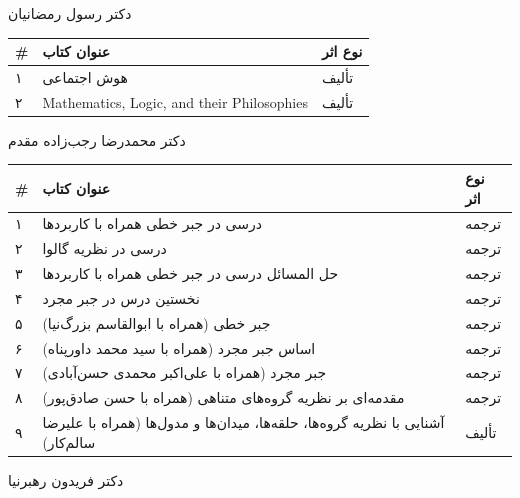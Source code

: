 \documentclass[
  letterpaper,
  DIV=11,
  numbers=noendperiod]{scrreprt}
\newcounter{none} %
\begin{document}
دکتر رسول رمضانیان

{\def\LTcaptype{none} %
\begin{longtable}[]{@{}lll@{}}
\toprule\noalign{}
\# & عنوان کتاب & نوع اثر \\
\midrule\noalign{}
\endhead
\bottomrule\noalign{}
\endlastfoot
۱ & هوش اجتماعی & تألیف \\
۲ & Mathematics, Logic, and their Philosophies & تألیف \\
\end{longtable}
}

دکتر محمدرضا رجب‌زاده مقدم

{\def\LTcaptype{none} %
\begin{longtable}[]{@{}
  >{\raggedright\arraybackslash}p{}
  >{\raggedright\arraybackslash}p{}
  >{\raggedright\arraybackslash}p{}@{}}
\toprule\noalign{}
\begin{minipage}[b]{\linewidth}\raggedright
\#
\end{minipage} & \begin{minipage}[b]{\linewidth}\raggedright
عنوان کتاب
\end{minipage} & \begin{minipage}[b]{\linewidth}\raggedright
نوع اثر
\end{minipage} \\
\midrule\noalign{}
\endhead
\bottomrule\noalign{}
\endlastfoot
۱ & درسی در جبر خطی همراه با کاربردها & ترجمه \\
۲ & درسی در نظریه گالوا & ترجمه \\
۳ & حل المسائل درسی در جبر خطی همراه با کاربردها & ترجمه \\
۴ & نخستین درس در جبر مجرد & ترجمه \\
۵ & جبر خطی (همراه با ابوالقاسم بزرگ‌نیا) & ترجمه \\
۶ & اساس جبر مجرد (همراه با سید محمد داورپناه) & ترجمه \\
۷ & جبر مجرد (همراه با علی‌اکبر محمدی حسن‌آبادی) & ترجمه \\
۸ & مقدمه‌ای بر نظریه گروه‌های متناهی (همراه با حسن صادق‌پور) & ترجمه \\
۹ & آشنایی با نظریه گروه‌ها، حلقه‌ها، میدان‌ها و مدول‌ها (همراه با علیرضا
سالم‌کار) & تألیف \\
\end{longtable}
}

دکتر فریدون رهبرنیا
\end{document}
